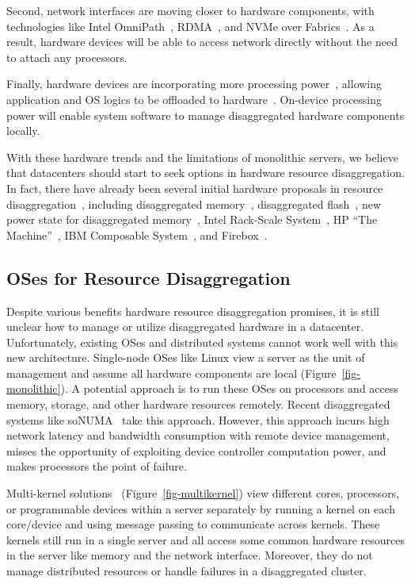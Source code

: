 \documentclass[10pt,times,twocolumn]{z2-article}
\begin{document}
Second, network interfaces are moving closer to hardware components,
with technologies like Intel OmniPath~\cite{OmniPath},
RDMA~\cite{ibverbs},
and NVMe over Fabrics~\cite{NVMe-fabrics-Inteltalk,NVMe-fabrics}.
As a result, hardware devices will be able to access network directly 
without the need to attach any processors. 

Finally, hardware devices are incorporating more processing power~\cite{Ahn15-PIM,Bojnordi12,Mellanox-SmartNIC,Mellanox-SmartNIC2,Agilio-SmartNIC,Junwhan-ISCA17},
allowing application and OS logics to be offloaded to hardware~\cite{Willow,Kaufmann16-ASPLOS}.
On-device processing power will enable system software to manage disaggregated hardware components locally.

With these hardware trends and the limitations of monolithic servers,
we believe that datacenters should start to seek options in hardware resource disaggregation.
In fact, there have already been several initial hardware proposals in resource disaggregation~\cite{OCP},
including disaggregated memory~\cite{Lim09-disaggregate,Scaleout-numa}, 
disaggregated flash~\cite{FlashDisaggregation,ReFlex},
new power state for disaggregated memory~\cite{Nitu18-EUROSYS},
Intel Rack-Scale System~\cite{IntelRackScale}, 
HP ``The Machine''~\cite{HP-TheMachine,HP-MemoryOS}, 
IBM Composable System~\cite{IBM-Composable},
and Firebox~\cite{FireBox-FASTKeynote}.

\subsection{OSes for Resource Disaggregation}
Despite various benefits hardware resource disaggregation promises, 
it is still unclear how to manage or utilize disaggregated hardware in a datacenter.
Unfortunately, existing OSes and distributed systems cannot work well with this new architecture.
Single-node OSes like Linux view a server as the unit of management and assume all hardware components are local (Figure~\ref{fig-monolithic}).
A potential approach is to run these OSes on processors
and access memory, storage, and other hardware resources remotely.
Recent disaggregated systems like soNUMA~\cite{Scaleout-numa} take this approach.
However, this approach incurs high network latency and bandwidth consumption with remote device management,
misses the opportunity of exploiting device controller computation power,
and makes processors the point of failure.

Multi-kernel solutions~\cite{Baumann-SOSP09,Barrelfish-DC,Helios-SOSP,fos-SOCC,Hive-SOSP} (Figure~\ref{fig-multikernel}) 
view different cores, processors, or programmable devices within a server separately 
by running a kernel on each core/device and using message passing to communicate across kernels.
These kernels still run in a single server and all access some common hardware resources in the server like memory and the network interface.
Moreover, they do not manage distributed resources or handle failures in a disaggregated cluster. 
\end{document}
